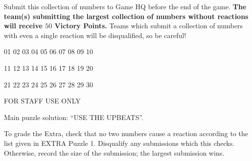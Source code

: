 \begin{extraPuzzle}
Submit this collection of numbers to Game HQ before the end of the game.
\textbf{The team(s) submitting the largest collection of numbers without
reactions will receive \(50\) Victory Points.} Teams which submit a collection of
numbers with even a single reaction will be disqualified, so be careful!

\begin{center}
    01 02 03 04 05 06 07 08 09 10

    11 12 13 14 15 16 17 18 19 20

    21 22 23 24 25 26 27 28 29 30
\end{center}
\end{extraPuzzle}



\begin{puzzleSolutions}
FOR STAFF USE ONLY

Main puzzle solution: ``USE THE UPBEATS''.

To grade the Extra,
check that no
two numbers cause a reaction according to the list given in EXTRA Puzzle 1.
Disqualify any submissions which this
checks. Otherwise, record the size of the submission; the largest submission
wins.
\end{puzzleSolutions}
